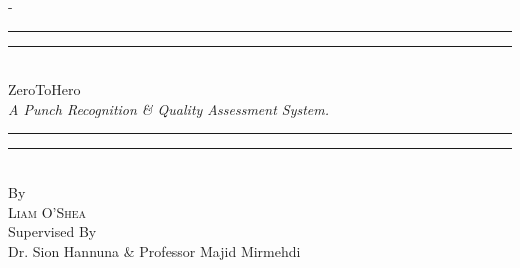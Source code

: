 %
%
% 
%
%
\begin{titlingpage}
\begin{SingleSpace}
\calccentering{\unitlength} 
\begin{adjustwidth*}{\unitlength}{-\unitlength}
\vspace*{13mm}
\begin{center}
\rule[0.5ex]{\linewidth}{2pt}\vspace*{-\baselineskip}\vspace*{3.2pt}
\rule[0.5ex]{\linewidth}{1pt}\\[\baselineskip]
{\HUGE ZeroToHero }\\[4mm]
{\Large \textit{A Punch Recognition \& Quality Assessment System.}}\\
\rule[0.5ex]{\linewidth}{1pt}\vspace*{-\baselineskip}\vspace{3.2pt}
\rule[0.5ex]{\linewidth}{2pt}\\
\vspace{6.5mm}
{\large By}\\
\vspace{5.0mm}
{\large\textsc{Liam O'Shea}}\\
\vspace{5.0mm}
{\large Supervised By}\\
\vspace{5.0mm}\tabularnewline
{\large {Dr. Sion Hannuna \& Professor Majid Mirmehdi}}


\end{center}
\end{adjustwidth*}
\end{SingleSpace}
\end{titlingpage}
